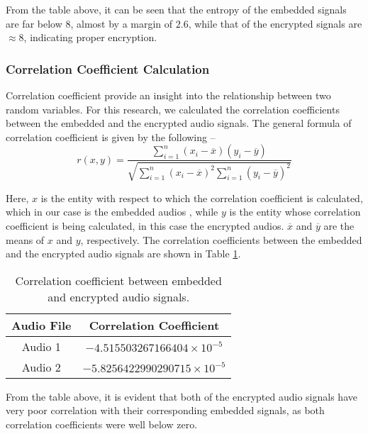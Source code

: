 \documentclass{article}
\begin{document}
From the table above, it can be seen that the entropy of the embedded signals are far below $8$, almost by a margin of $2.6$, while that of the encrypted signals are $\approx8$, indicating proper encryption.
\subsubsection{Correlation Coefficient Calculation}
Correlation coefficient provide an insight into the relationship between two random variables. For this research, we calculated the correlation coefficients between the embedded and the encrypted audio signals. The general formula of correlation coefficient is given by the following --
\begin{equation}
    r(x,y)=\frac{\sum_{i=1}^{n}(x_i-\overline{x})(y_i-\overline{y})}{\sqrt{\sum_{i=1}^{n}(x_i-\overline{x})^2\sum_{i=1}^{n}(y_i-\overline{y})^2}}
\end{equation}

Here, $x$ is the entity with respect to which the correlation coefficient is calculated, which in our case is the embedded audios
, while $y$ is the entity whose correlation coefficient is being calculated, in this case the encrypted audios. $\overline{x}$ and $\overline{y}$ are the means of $x$ and $y$, respectively. The correlation coefficients between the embedded and the encrypted audio signals are shown in Table \ref{table:corrcoef}.
\begin{table}[!h]
    \begin{center}
        \caption{Correlation coefficient between embedded and encrypted audio signals.}
        \begin{tabular}{cc}
            \hline
            Audio File & Correlation Coefficient            \\ \hline
            Audio 1    & $-4.515503267166404\times10^{-5}$  \\ \hdashline
            Audio 2    & $-5.8256422990290715\times10^{-5}$ \\ \hline
        \end{tabular}
        \label{table:corrcoef}
    \end{center}
\end{table}

From the table above, it is evident that both of the encrypted audio signals have very poor correlation with their corresponding embedded signals, as both correlation coefficients were well below zero.
\end{document}
